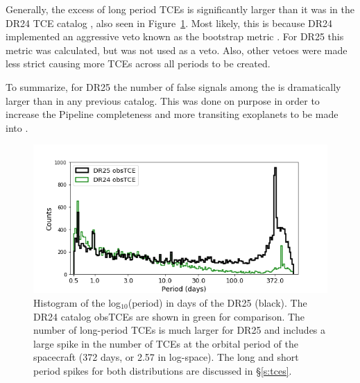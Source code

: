 Generally, the excess of long period TCEs is significantly larger than it was in the DR24 TCE catalog \citep{Seader2015}, also seen in Figure~\ref{f:obstces}. Most likely, this is because DR24 implemented an aggressive veto known as the bootstrap metric \citep{Seader2015}.  For DR25 this metric was calculated, but was not used as a veto. Also, other vetoes were made less strict causing more TCEs across all periods to be created. 

To summarize, for DR25 the number of false signals among the   is dramatically larger than in any previous catalog. This was done on purpose in order to increase the Pipeline completeness and more transiting exoplanets to be made into . 

\begin{figure}[ht]
 \begin{center}
  \includegraphics[width=0.85\linewidth]{fig-obstcePeriods.png}
  \caption{Histogram of the log$_{10}$(period) in days of the DR25  (black). The DR24 catalog obsTCEs \citep{Seader2015} are shown in green for comparison. The number of long-period TCEs is much larger for DR25 and includes a large spike in the number of TCEs at the orbital period of the spacecraft (372 days, or 2.57 in log-space). The long and short period spikes for both distributions are discussed in \S\ref{s:tces}.}
  \label{f:obstces} 
 \end{center}
 \end{figure}



